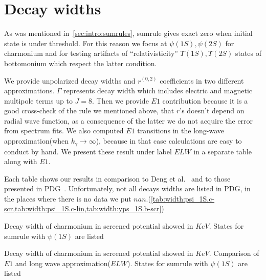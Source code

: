 \chapter{Decay widths}

As was mentioned in~\cref{sec:intro:sumrules}, sumrule gives exact zero when initial state is under threshold. For this reason we focus at $\psi(1S),\psi(2S)$ for charmonium and for testing artifacts of ``relativisticity'' $\Upsilon(1S),\Upsilon(2S)$ states of bottomonium which respect the latter condition.

We provide unpolarized decay widths and $r^{(0,2)}$ coefficients in two different approximations. $\Gamma$ represents decay width which includes electric and magnetic multipole terms up to $J=8$. Then we provide $E1$ contribution because it is a good cross-check of the rule we mentioned above, that $r$'s doesn't depend on radial wave function, as a consequence of the latter we do not acquire the error from spectrum fits. We also computed $E1$ transitions in the long-wave approximation(when $k_\gamma \rightarrow \infty$), because in that case calculations are easy to conduct by hand. We present these result under label $ELW$ in a separate table along with $E1$.

Each table shows our results in comparison to Deng et al.~\cite{deng-charm,deng-bot} and to those presented in PDG~\cite{pdg}. Unfortunately, not all decays widths are listed in PDG, in the places where there is no data we put $nan$.(\cref{tab:width:psi_1S.c-scr,tab:width:psi_1S.c-lin,tab:width:yps_1S.b-scr})

\begin{table}[H]
    \centering
    \caption{Decay width of charmonium in screened potential showed in $KeV$. States for sumrule with $\psi(1S)$ are listed \label{tab:width:psi_1S.c-scr}}
    \begin{footnotesize}
        
    \end{footnotesize}
\end{table}

\begin{table}[H]
    \centering
    \caption{Decay width of charmonium in screened potential showed in $KeV$. Comparison of $E1$ and long wave approximation($ELW$). States for sumrule with $\psi(1S)$ are listed \label{tab:width:ELW.psi_1S.c-scr}}
    \begin{footnotesize}
        
    \end{footnotesize}
\end{table}

